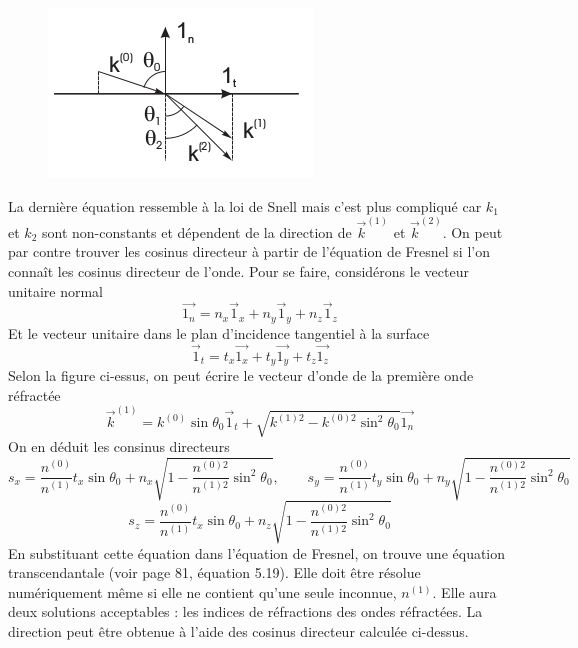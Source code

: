	\begin{figure}
	\vspace{-5mm}
	\includegraphics[scale=0.5]{ch5/image2}
	\end{figure}
La dernière équation ressemble à la loi de Snell mais c'est plus compliqué car $k_1$ et $k_2$ sont
non-constants et dépendent de la direction de $\vec{k}^{(1)}$ et $\vec{k}^{(2)}$. On peut par contre
trouver les cosinus directeur à partir de l'équation de Fresnel si l'on connaît les cosinus directeur
de l'onde. Pour se faire, considérons le vecteur unitaire normal
\begin{equation}
\vec{1_n} = n_x\vec 1_x+n_y\vec 1_y+n_z\vec 1_z
\end{equation}
Et le vecteur unitaire dans le plan d'incidence tangentiel à la surface
\begin{equation}
\vec 1_t = t_x\vec{1_x}+t_y\vec{1_y}+t_z\vec{1_z}
\end{equation}
Selon la figure ci-essus, on peut écrire le vecteur d'onde de la première onde réfractée
\begin{equation}
\vec{k}^{(1)} = k^{(0)}\sin\theta_0\vec{1}_t+\sqrt{k^{(1)2}-k^{(0)2}\sin^2\theta_0}\vec{1_n}
\end{equation}
On en déduit les consinus directeurs
\begin{equation}
s_x = \frac{n^{(0)}}{n^{(1)}}t_x\sin\theta_0+n_x\sqrt{1-\frac{n^{(0)2}}{n^{(1)2}}\sin^2\theta_0},\qquad
s_y = \frac{n^{(0)}}{n^{(1)}}t_y\sin\theta_0+n_y\sqrt{1-\frac{n^{(0)2}}{n^{(1)2}}\sin^2\theta_0}
\end{equation}
\begin{equation}
s_z = \frac{n^{(0)}}{n^{(1)}}t_x\sin\theta_0+n_z\sqrt{1-\frac{n^{(0)2}}{n^{(1)2}}\sin^2\theta_0}
\end{equation}
En substituant cette équation dans l'équation de Fresnel, on trouve une équation transcendantale
(voir page 81, équation 5.19). Elle doit être résolue numériquement même si elle ne contient qu'une 
seule inconnue, $n^{(1)}$. Elle aura deux solutions acceptables : les indices de réfractions des
ondes réfractées. La direction peut être obtenue à l'aide des cosinus directeur calculée ci-dessus.



